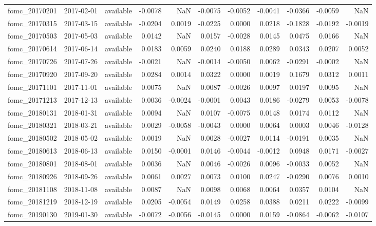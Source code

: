 \begin{tabular}{lllrrrrrrrr}
fomc_20170201 & 2017-02-01 & available & -0.0078 & NaN & -0.0075 & -0.0052 & -0.0041 & -0.0366 & -0.0059 & NaN \\
fomc_20170315 & 2017-03-15 & available & -0.0204 & 0.0019 & -0.0225 & 0.0000 & 0.0218 & -0.1828 & -0.0192 & -0.0019 \\
fomc_20170503 & 2017-05-03 & available & 0.0142 & NaN & 0.0157 & -0.0028 & 0.0145 & 0.0475 & 0.0166 & NaN \\
fomc_20170614 & 2017-06-14 & available & 0.0183 & 0.0059 & 0.0240 & 0.0188 & 0.0289 & 0.0343 & 0.0207 & 0.0052 \\
fomc_20170726 & 2017-07-26 & available & -0.0021 & NaN & -0.0014 & -0.0050 & 0.0062 & -0.0291 & -0.0002 & NaN \\
fomc_20170920 & 2017-09-20 & available & 0.0284 & 0.0014 & 0.0322 & 0.0000 & 0.0019 & 0.1679 & 0.0312 & 0.0011 \\
fomc_20171101 & 2017-11-01 & available & 0.0075 & NaN & 0.0087 & -0.0026 & 0.0097 & 0.0197 & 0.0095 & NaN \\
fomc_20171213 & 2017-12-13 & available & 0.0036 & -0.0024 & -0.0001 & 0.0043 & 0.0186 & -0.0279 & 0.0053 & -0.0078 \\
fomc_20180131 & 2018-01-31 & available & 0.0094 & NaN & 0.0107 & -0.0075 & 0.0148 & 0.0174 & 0.0112 & NaN \\
fomc_20180321 & 2018-03-21 & available & 0.0029 & -0.0058 & -0.0043 & 0.0000 & 0.0064 & 0.0003 & 0.0046 & -0.0128 \\
fomc_20180502 & 2018-05-02 & available & 0.0019 & NaN & 0.0028 & -0.0027 & 0.0114 & -0.0191 & 0.0035 & NaN \\
fomc_20180613 & 2018-06-13 & available & 0.0150 & -0.0001 & 0.0146 & -0.0044 & -0.0012 & 0.0948 & 0.0171 & -0.0027 \\
fomc_20180801 & 2018-08-01 & available & 0.0036 & NaN & 0.0046 & -0.0026 & 0.0096 & -0.0033 & 0.0052 & NaN \\
fomc_20180926 & 2018-09-26 & available & 0.0061 & 0.0027 & 0.0073 & 0.0100 & 0.0247 & -0.0290 & 0.0076 & 0.0010 \\
fomc_20181108 & 2018-11-08 & available & 0.0087 & NaN & 0.0098 & 0.0068 & 0.0064 & 0.0357 & 0.0104 & NaN \\
fomc_20181219 & 2018-12-19 & available & 0.0205 & -0.0054 & 0.0149 & 0.0258 & 0.0388 & 0.0211 & 0.0222 & -0.0099 \\
fomc_20190130 & 2019-01-30 & available & -0.0072 & -0.0056 & -0.0145 & 0.0000 & 0.0159 & -0.0864 & -0.0062 & -0.0107 \\

\end{tabular}
